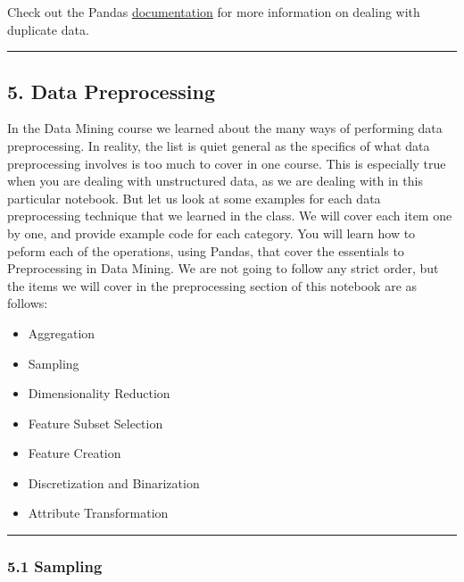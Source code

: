 \documentclass[11pt]{article}
\providecommand{\tightlist}{%
      \setlength{\itemsep}{0pt}\setlength{\parskip}{0pt}}
\begin{document}
    Check out the Pandas
\href{http://pandas.pydata.org/pandas-docs/stable/indexing.html?highlight=duplicate\#duplicate-data}{documentation}
for more information on dealing with duplicate data.

    \begin{center}\rule{0.5\linewidth}{\linethickness}\end{center}

    \hypertarget{data-preprocessing}{%
\subsection{5. Data Preprocessing}\label{data-preprocessing}}

In the Data Mining course we learned about the many ways of performing
data preprocessing. In reality, the list is quiet general as the
specifics of what data preprocessing involves is too much to cover in
one course. This is especially true when you are dealing with
unstructured data, as we are dealing with in this particular notebook.
But let us look at some examples for each data preprocessing technique
that we learned in the class. We will cover each item one by one, and
provide example code for each category. You will learn how to peform
each of the operations, using Pandas, that cover the essentials to
Preprocessing in Data Mining. We are not going to follow any strict
order, but the items we will cover in the preprocessing section of this
notebook are as follows:

\begin{itemize}
\tightlist
\item
  Aggregation
\item
  Sampling
\item
  Dimensionality Reduction
\item
  Feature Subset Selection
\item
  Feature Creation
\item
  Discretization and Binarization
\item
  Attribute Transformation
\end{itemize}

    \begin{center}\rule{0.5\linewidth}{\linethickness}\end{center}

    \hypertarget{sampling}{%
\subsubsection{5.1 Sampling}\label{sampling}}
\end{document}
